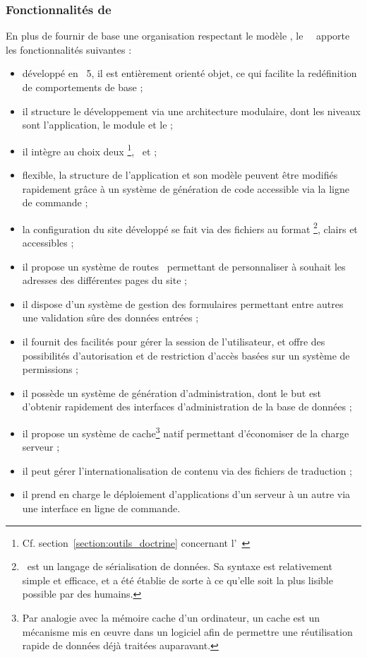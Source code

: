 \subsubsection{Fonctionnalités de \asf}

En plus de fournir de base une organisation respectant le modèle \amvc, le \afm\ \asf\ apporte les fonctionnalités suivantes :

\begin{itemize}
	\item développé en \aphp~5, il est entièrement orienté objet, ce qui facilite la redéfinition de comportements de base ;
	\item il structure le développement via une architecture modulaire, dont les niveaux sont l'application, le module et le \aplugin ;
	\item il intègre au choix deux \aorms\footnote{Cf. section~\ref{section:outils_doctrine} concernant l'\aorm\ \adoctrine}, \adoctrine\ et \apropel ;
	\item flexible, la structure de l'application et son modèle peuvent être modifiés rapidement grâce à un système de génération de code accessible via la ligne de commande ;
	\item la configuration du site développé se fait via des fichiers au format \ayml\footnote{\ayml\ est un langage de sérialisation de données. Sa syntaxe est relativement simple et efficace, et a été établie de sorte à ce qu'elle soit la plus lisible possible par des humains.\cite{yml}}, clairs et accessibles ;
	\item il propose un système de \og routes \fg\ permettant de personnaliser à souhait les adresses des différentes pages du site ;
	\item il dispose d'un système de gestion des formulaires permettant entre autres une validation sûre des données entrées ;
	\item il fournit des facilités pour gérer la session de l'utilisateur, et offre des possibilités d'autorisation et de restriction d'accès basées sur un système de permissions ;
	\item il possède un système de génération d'administration, dont le but est d'obtenir rapidement des interfaces d'administration de la base de don\-nées ;
	\item il propose un système de cache\footnote{Par analogie avec la mémoire cache d'un ordinateur, un cache est un mécanisme mis en œuvre dans un logiciel afin de permettre une réutilisation rapide de données déjà traitées auparavant.\cite{cache}} natif permettant d'économiser de la charge serveur ;
	\item il peut gérer l'internationalisation de contenu via des fichiers de traduction ;
	\item il prend en charge le déploiement d'applications d'un serveur à un autre via une interface en ligne de commande.
\end{itemize}
